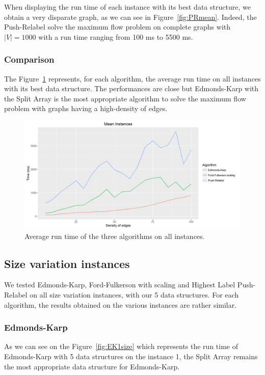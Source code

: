 When displaying the run time of each instance with its best data structure, we obtain a very disparate graph, as we can see in Figure~\ref{fig:PRmean}. Indeed, the Push-Relabel solve the maximum flow problem on complete graphs with $|V|=1000$ with a run time ranging from 100 ms to 5500 ms.

\subsubsection{Comparison}
The Figure~\ref{fig:MeanInstances} represents, for each algorithm, the average run time on all instances with its best data structure. The performances are close but Edmonds-Karp with the Split Array is the most appropriate algorithm to solve the maximum flow problem with graphs having a high-density of edges.

\begin{figure}[H]
\includegraphics[scale=0.5]{images/MeanInstances.png}
\caption{Average run time of the three algorithms on all instances.}
\label{fig:MeanInstances}
\end{figure}

\subsection{Size variation instances}
We tested Edmonds-Karp, Ford-Fulkerson with scaling and Highest Label Push-Relabel on all size variation instances, with our 5 data structures. For each algorithm, the results obtained on the various instances are rather similar.

\subsubsection{Edmonds-Karp}
As we can see on the Figure~\ref{fig:EK1size} which represents the run time of Edmonds-Karp with 5 data structures on the instance 1, the Split Array remains the most appropriate data structure for Edmonds-Karp.

